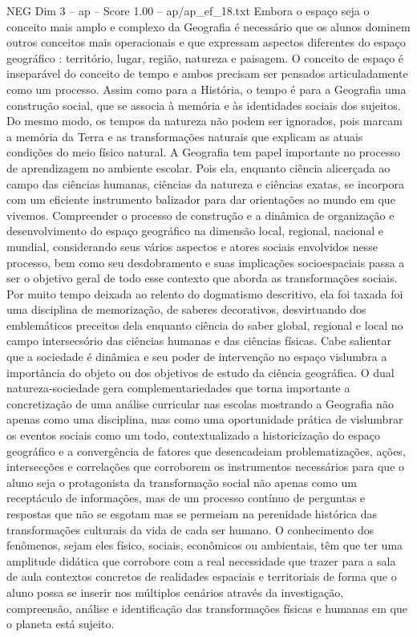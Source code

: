 \begin{textsample}{NEG Dim 3 – ap – Score 1.00 – ap/ap\_ef\_18.txt}
Embora o espaço seja o conceito mais amplo e complexo da Geografia é necessário que os alunos dominem outros conceitos mais operacionais e que expressam aspectos diferentes do espaço geográfico : território, lugar, região, natureza e paisagem.
O conceito de espaço é inseparável do conceito de tempo e ambos precisam ser pensados articuladamente como um processo.
Assim como para a História, o tempo é para a Geografia uma construção social, que se associa à memória e às identidades sociais dos sujeitos.
Do mesmo modo, os tempos da natureza não podem ser ignorados, pois marcam a memória da Terra e as transformações naturais que explicam as atuais condições do meio físico natural.
A Geografia tem papel importante no processo de aprendizagem no ambiente escolar.
Pois ela, enquanto ciência alicerçada ao campo das ciências humanas, ciências da natureza e ciências exatas, se incorpora com um eficiente instrumento balizador para dar orientações ao mundo em que vivemos.
Compreender o processo de construção e a dinâmica de organização e desenvolvimento do espaço geográfico na dimensão local, regional, nacional e mundial, considerando seus vários aspectos e atores sociais envolvidos nesse processo, bem como seu desdobramento e suas implicações socioespaciais passa a ser o objetivo geral de todo esse contexto que aborda as transformações sociais.
Por muito tempo deixada ao relento do dogmatismo descritivo, ela foi taxada foi uma disciplina de memorização, de saberes decorativos, desvirtuando dos emblemáticos preceitos dela enquanto ciência do saber global, regional e local no campo intersecsório das ciências humanas e das ciências físicas.
Cabe salientar que a sociedade é dinâmica e seu poder de intervenção no espaço vislumbra a importância do objeto ou dos objetivos de estudo da ciência geográfica.
O dual natureza-sociedade gera complementariedades que torna importante a concretização de uma análise curricular nas escolas mostrando a Geografia não apenas como uma disciplina, mas como uma oportunidade prática de vislumbrar os eventos sociais como um todo, contextualizado a historicização do espaço geográfico e a convergência de fatores que desencadeiam problematizações, ações, intersecções e correlações que corroborem os instrumentos necessários para que o aluno seja o protagonista da transformação social não apenas como um receptáculo de informações, mas de um processo contínuo de perguntas e respostas que não se esgotam mas se permeiam na perenidade histórica das transformações culturais da vida de cada ser humano.
O conhecimento dos fenômenos, sejam eles físico, sociais, econômicos ou ambientais, têm que ter uma amplitude didática que corrobore com a real necessidade que trazer para a sala de aula contextos concretos de realidades espaciais e territoriais de forma que o aluno possa se inserir nos múltiplos cenários através da investigação, compreensão, análise e identificação das transformações físicas e humanas em que o planeta está sujeito.

\end{textsample}
